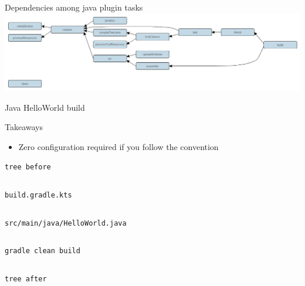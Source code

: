\documentclass[presentation]{beamer}
\newcommand{\codefile}[4]{
	\begin{block}{\texttt{#2}}
		\inputminted[fontsize=#3,linenos=true,breaklines=true]{#4}{"workspace/#1/#2"}
	\end{block}
}
\newcommand{\java}[3]{\codefile{#1}{#2}{#3}{java}}
\newcommand{\groovy}[3]{\codefile{#1}{#2}{#3}{groovy}}
\newcommand{\terminal}[3]{\codefile{#1}{#2}{#3}{text}}
\begin{document}
\begin{frame}[fragile]{Dependencies among java plugin tasks}
    \includegraphics[width=\textwidth]{img/javaPluginTasks}
\end{frame}

\begin{frame}{Java HelloWorld build}
    \begin{block}{Takeaways}
        \begin{itemize}
            \item Zero configuration required if you follow the convention
        \end{itemize}
    \end{block}
    \terminal{13-Java}{tree before}{\normalsize}
    \groovy{13-Java}{build.gradle.kts}{\normalsize}
    \java{13-Java}{src/main/java/HelloWorld.java}{\normalsize}
    \terminal{13-Java}{gradle clean build}{\scriptsize}
    \terminal{13-Java}{tree after}{\scriptsize}
\end{frame}
\end{document}

